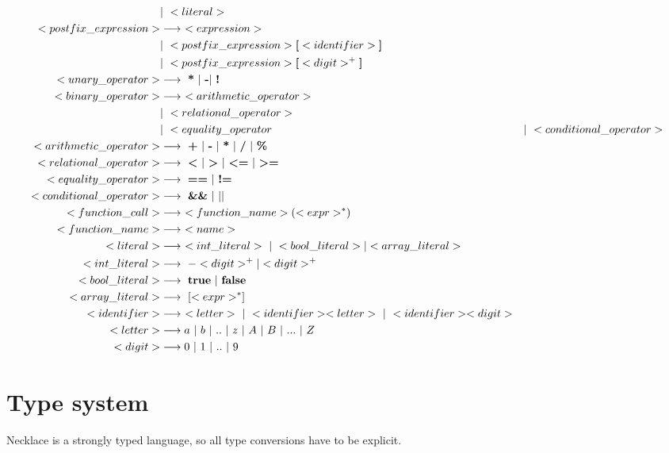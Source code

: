 \documentclass{article}
\begin{document}
\begin{align*}
 &| \ <literal> \\
<postfix\_expression> &\longrightarrow \ <expression> \\
    &| \ <postfix\_expression> \textbf{[} <identifier> \textbf{]}  \\
    &| \ <postfix\_expression> \textbf{[} <digit>^+ \textbf{]}  \\
<unary\_operator> &\longrightarrow \ \textbf{*} \ | \ \textbf{-} | \ \textbf{!} \\
<binary\_operator> &\longrightarrow \ <arithmetic\_operator> \\ 
    &| \ <relational\_operator> \\
    &| \ <equality\_operator
    &| \ <conditional\_operator> \\
<arithmetic\_operator> &\longrightarrow \ \textbf{+} \
    | \ \textbf{-} \
    | \ \textbf{*} \
    | \ \textbf{/} \
    | \ \textbf{\%} \\
<relational\_operator> &\longrightarrow \ \textbf{\textless} \
    | \ \textbf{\textgreater} \
    | \ \textbf{\textless=} \
    | \ \textbf{\textgreater=} \\
<equality\_operator> &\longrightarrow \ \textbf{==} \ | \ \textbf{!=} \\
<conditional\_operator> &\longrightarrow \ \textbf{\&\&} \ | \ \textbf{$\mid\mid$} \\
<function\_call> &\longrightarrow \ <function\_name> ( <expr>^* ) \\
<function\_name> &\longrightarrow \ <name> \\
<literal> &\longrightarrow \ <int\_literal> \ | \ <bool\_literal> | <array\_literal> \\
<int\_literal> &\longrightarrow \ - <digit>^+|<digit>^+ \\
<bool\_literal> &\longrightarrow \ \textbf{true} \ | \ \textbf{false} \\
<array\_literal> &\longrightarrow \ [<expr>^*] \\
<identifier> &\longrightarrow \ <letter> \ | \ <identifier> <letter> \ | \ <identifier><digit> \\
<letter> &\longrightarrow a \ | \ b \ | \ .. \ | \ z \ | \ A \ | \ B \ | \ ... \ | \ Z \\
<digit> &\longrightarrow 0 \ | \ 1 \ | \ .. \ | \ 9 \\
\end{align*}

\section{Type system}
Necklace is a strongly typed language, so all type conversions have to be explicit.
\end{document}
